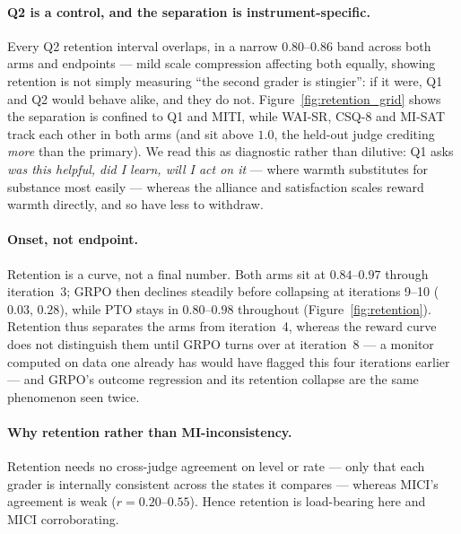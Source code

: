 \paragraph{Q2 is a control, and the separation is instrument-specific.} Every Q2 retention
interval overlaps, in a narrow $0.80$--$0.86$ band across both arms and endpoints --- mild scale
compression affecting both equally, showing retention is not simply measuring ``the second
grader is stingier'': if it were, Q1 and Q2 would behave alike, and they do not.
Figure~\ref{fig:retention_grid} shows the separation is confined to Q1 and MITI, while WAI-SR,
CSQ-8 and MI-SAT track each other in both arms (and sit above $1.0$, the held-out judge
crediting \emph{more} than the primary). We read this as diagnostic rather than dilutive: Q1
asks \emph{was this helpful, did I learn, will I act on it} --- where warmth substitutes for
substance most easily --- whereas the alliance and satisfaction scales reward warmth directly,
and so have less to withdraw.

\paragraph{Onset, not endpoint.} Retention is a curve, not a final number. Both arms sit at
$0.84$--$0.97$ through iteration~3; GRPO then declines steadily before collapsing at iterations
9--10 ($0.03$, $0.28$), while PTO stays in $0.80$--$0.98$ throughout
(Figure~\ref{fig:retention}). Retention thus separates the arms from iteration~4, whereas the
reward curve does not distinguish them until GRPO turns over at iteration~8 --- a monitor
computed on data one already has would have flagged this four iterations earlier --- and GRPO's
outcome regression and its retention collapse are the same phenomenon seen twice.

\paragraph{Why retention rather than MI-inconsistency.} Retention needs no cross-judge agreement
on level or rate --- only that each grader is internally consistent across the states it
compares --- whereas MICI's agreement is weak ($r=0.20$--$0.55$). Hence retention is
load-bearing here and MICI corroborating.
